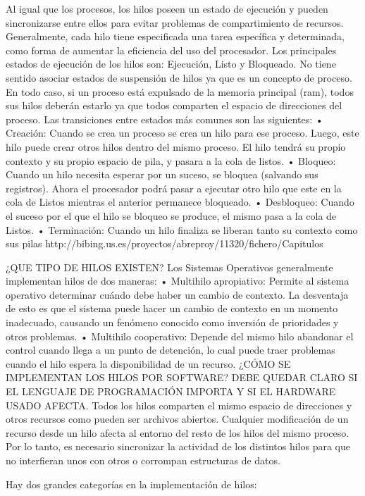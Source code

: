 \documentclass[conference]{IEEEtran}
\begin{document}
Al igual que los procesos, los hilos poseen un estado de ejecución y pueden sincronizarse entre ellos para evitar problemas de compartimiento de recursos. Generalmente, cada hilo tiene especificada una tarea específica y determinada, como forma de aumentar la eficiencia del uso del procesador. Los principales estados de ejecución de los hilos son: Ejecución, Listo y Bloqueado. No tiene sentido asociar estados de suspensión de hilos ya que es un concepto de proceso. En todo caso, si un proceso está expulsado de la memoria principal (ram), todos sus hilos deberán estarlo ya que todos comparten el espacio de direcciones del proceso. Las transiciones entre estados más comunes son las siguientes: • Creación: Cuando se crea un proceso se crea un hilo para ese proceso. Luego, este hilo puede crear otros hilos dentro del mismo proceso. El hilo tendrá su propio contexto y su propio espacio de pila, y pasara a la cola de listos. • Bloqueo: Cuando un hilo necesita esperar por un suceso, se bloquea (salvando sus registros). Ahora el procesador podrá pasar a ejecutar otro hilo que este en la cola de Listos mientras el anterior permanece bloqueado. • Desbloqueo: Cuando el suceso por el que el hilo se bloqueo se produce, el mismo pasa a la cola de Listos. • Terminación: Cuando un hilo finaliza se liberan tanto su contexto como sus pilas
http://bibing.us.es/proyectos/abreproy/11320/fichero/Capitulos%

¿QUE TIPO DE HILOS EXISTEN?
Los Sistemas Operativos generalmente implementan hilos de dos maneras:
 • Multihilo apropiativo: Permite al sistema operativo determinar cuándo debe haber un cambio de contexto. La desventaja de esto es que el sistema puede hacer un cambio de contexto en un momento inadecuado, causando un fenómeno conocido como inversión de prioridades y otros problemas. 
• Multihilo cooperativo: Depende del mismo hilo abandonar el control cuando llega a un punto de detención, lo cual puede traer problemas cuando el hilo espera la disponibilidad de un recurso.
¿CÓMO SE IMPLEMENTAN LOS HILOS POR SOFTWARE? DEBE QUEDAR CLARO SI EL LENGUAJE DE PROGRAMACIÓN IMPORTA Y SI EL HARDWARE USADO AFECTA.
Todos los hilos comparten el mismo espacio de direcciones y otros recursos como pueden ser archivos abiertos. Cualquier modificación de un recurso desde un hilo afecta al entorno del resto de los hilos del mismo proceso. Por lo tanto, es necesario sincronizar la actividad de los distintos hilos para que no interfieran unos con otros o corrompan estructuras de datos.

Hay dos grandes categorías en la implementación de hilos:
\end{document}
